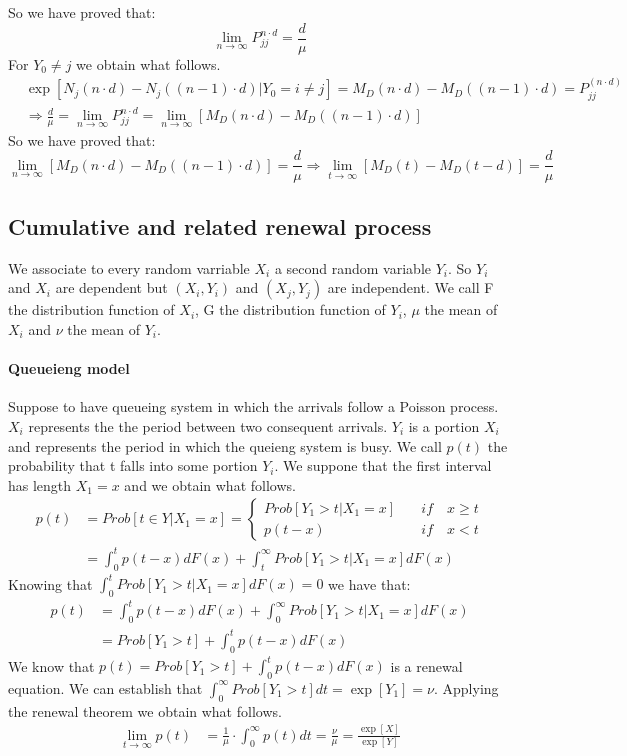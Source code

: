 So we have proved that:
\begin{equation}
	\lim_{n \to \infty} P_{jj}^{n \cdot d}=\frac{d}{\mu}
\end{equation}
For $Y_0 \neq j$ we obtain what follows.
\begin{align*}
	& \exp[N_j(n \cdot d)-N_j((n-1) \cdot d)|Y_0=i \neq j]=M_D(n \cdot d)-M_D((n-1) \cdot d)=P_{jj}^{(n \cdot d)}
	\\ & \Rightarrow \frac{d}{\mu}=\lim_{n \to \infty} P_{jj}^{n \cdot d} = \lim_{n \to \infty} [M_D(n \cdot d)-M_D((n-1) \cdot d)]
\end{align*}
So we have proved that:
\begin{equation}
	\lim_{n \to \infty} [M_D(n \cdot d)-M_D((n-1) \cdot d)]=\frac{d}{\mu} \Rightarrow \lim_{t \to \infty }[M_D(t)-M_D(t-d)]=\frac{d}{\mu}
\end{equation}

\subsection{Cumulative and related renewal process}
We associate to every random varriable $X_i$ a second random variable $Y_i$. So $Y_i$ and $X_i$ are dependent but $(X_i,Y_i)$ and $(X_j,Y_j)$ are independent. We call F the distribution function of $X_i$, G the distribution function of $Y_i$, $\mu$ the mean of $X_i$ and $\nu$ the mean of $Y_i$.
\paragraph{Queueieng model}
Suppose to have queueing system in which the arrivals follow a Poisson process. $X_i$ represents the the period between two consequent arrivals. $Y_i$ is a portion $X_i$ and represents the period in which the queieng system is busy. We call $p(t)$ the probability that t falls into some portion $Y_i$. We suppone that the first interval has length $X_1=x$ and we obtain what follows.
\begin{align*}
	p(t) & =Prob[t \in Y |X_1 = x]=\begin{cases}
		Prob[Y_1>t|X_1=x] \quad & if \quad x \geq t
		\\ p(t-x) \quad & if \quad x<t
	\end{cases}
	\\ & = \int_0^t p(t-x)dF(x)+\int_t^{\infty}Prob[Y_1>t|X_1=x]dF(x)
\end{align*}
Knowing that $\int_0^{t}Prob[Y_1>t|X_1=x]dF(x)=0$ we have that:
\begin{align*}
	p(t) & = \int_0^t p(t-x)dF(x)+\int_0^{\infty}Prob[Y_1>t|X_1=x]dF(x)
	\\ & = Prob[Y_1>t]+\int_0^t p(t-x)dF(x)
\end{align*}
We know that $p(t)= Prob[Y_1>t]+\int_0^t p(t-x)dF(x)$ is a renewal equation. We can establish that $\int_0^{\infty}Prob[Y_1>t]dt=\exp[Y_1]=\nu$. Applying the renewal theorem we obtain what follows.
\begin{align*}
	\lim_{t \to \infty} p(t) & = \frac{1}{\mu}\cdot\int_0^{\infty}p(t)dt = \frac{\nu}{\mu}= \frac{\exp[X]}{\exp[Y]}
\end{align*}

